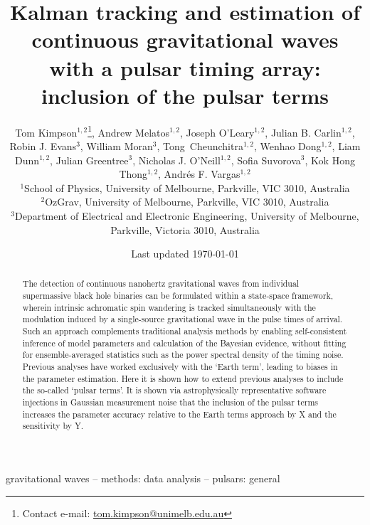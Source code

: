 \documentclass[fleqn,usenatbib,useAMS]{mnras}
\title[Kalman PTA]{Kalman tracking and estimation of continuous gravitational waves with a pulsar timing array: inclusion of the pulsar terms}
\author[Kimpson]{Tom Kimpson$^{1,2}$\thanks{Contact e-mail: \href{tom.kimpson@unimelb.edu.au}{tom.kimpson@unimelb.edu.au}}, Andrew Melatos$^{1,2}$, Joseph O'Leary$^{1,2}$, Julian B. Carlin$^{1,2}$, Robin J. Evans$^{3}$, \newauthor William Moran$^{3}$, Tong Cheunchitra$^{1,2}$, Wenhao Dong$^{1,2}$, Liam Dunn$^{1,2}$, Julian Greentree$^{3}$, Nicholas J. O'Neill$^{1,2}$, \newauthor Sofia Suvorova$^{3}$, Kok Hong Thong$^{1,2}$, Andrés F. Vargas$^{1,2}$%
\\
$^{1}$School of Physics, University of Melbourne, Parkville, VIC 3010, Australia \\
$^{2}$OzGrav, University of Melbourne, Parkville, VIC 3010, Australia \\
$^{3}$Department of Electrical and Electronic Engineering, University of Melbourne, Parkville, Victoria 3010, Australia }
\date{Last updated \today}
\begin{document}
\label{firstpage}
\pagerange{\pageref{firstpage}--\pageref{lastpage}}
\maketitle

\begin{abstract}	
	The detection of continuous nanohertz gravitational waves from individual supermassive black hole binaries can be formulated within a state-space framework, wherein intrinsic achromatic spin wandering is tracked simultaneously with the modulation induced by a single-source gravitational wave in the pulse times of arrival. Such an approach complements traditional analysis methods by enabling self-consistent inference of model parameters and calculation of the Bayesian evidence, without fitting for ensemble-averaged statistics such as the power spectral density of the timing noise. Previous analyses have worked exclusively with the `Earth term', leading to biases in the parameter estimation. Here it is shown how to extend previous analyses to include the so-called `pulsar terms'. It is shown via astrophysically representative software injections in Gaussian measurement noise that the inclusion of the pulsar terms increases the parameter accuracy relative to the Earth terms approach by X and the sensitivity by Y. 
\end{abstract}

\begin{keywords}
gravitational waves -- methods: data analysis -- pulsars: general
\end{keywords}



\begingroup
\let\clearpage\relax
\endgroup
\newpage
\end{document}
